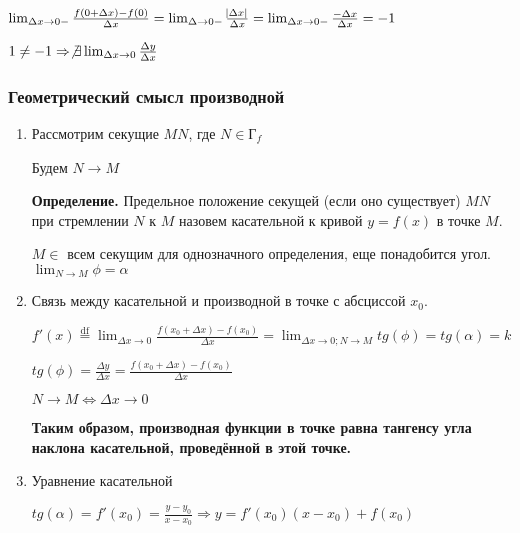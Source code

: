 \documentclass{article}
\begin{document}
    \( \lim_{\Delta x \to 0-} \frac{f(0 + \Delta x) - f(0)}{\Delta x} = \lim_{\Delta \to 0-} \frac{\abs{\Delta x}}{\Delta x} = \lim_{\Delta x \to 0-} \frac{-\Delta x}{\Delta x} = -1 \)

    \( 1 \neq -1 \Rightarrow \not\exists \lim_{\Delta x \to 0} \frac{\Delta y}{\Delta x} \)

    \subsubsection{Геометрический смысл производной}

    \begin{enumerate}
        \item 
        

            Рассмотрим секущие \( MN \), где \( N \in \textrm{Г}_{f} \)

            Будем \( N \to M \)

            \textbf{Определение.} Предельное положение секущей (если оно существует) \( MN \) при стремлении \( N \) к \( M \) назовем касательной к кривой \( y = f(x) \) в точке \( M \).
            
            \( M \in \) всем секущим для однозначного определения, еще понадобится угол. \( \lim_{N \to M} \phi = \alpha \)

        \item Связь между касательной и производной в точке с абсциссой \( x_0 \). 
        
            \( f'(x) \stackrel{\text{df}}{=} \lim_{\Delta x \to 0} \frac{f(x_0 + \Delta x) - f(x_0)}{\Delta x} = \lim_{\Delta x \to 0; N \to M} tg(\phi) = tg(\alpha) = k\)


            \( tg(\phi) = \frac{\Delta y}{\Delta x} = \frac{f(x_0 + \Delta x) - f(x_0)}{\Delta x} \)

            \( N \to M \Leftrightarrow \Delta x \to 0 \)

            \textbf{Таким образом, производная функции в точке равна тангенсу угла наклона касательной, проведённой в этой точке.}

        \item Уравнение касательной 
        

            \( tg(\alpha) = f'(x_0) = \frac{y - y_0}{x - x_0} \Rightarrow y = f'(x_0)(x - x_0) + f(x_0) \)
    \end{enumerate}
\end{document}
